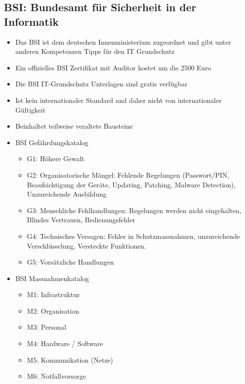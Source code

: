 \subsection{BSI: Bundesamt für Sicherheit in der Informatik}
\begin{itemize}
	\item Das BSI ist dem deutschen Innenministerium zugeordnet und gibt unter anderen Kompetenzen Tipps für den IT Grundschutz
	\item Ein offizielles BSI Zertifikat mit Auditor kostet um die 2500 Euro
	\item Die BSI IT-Grundschutz Unterlagen sind gratis verfügbar
	\item Ist kein internationaler Standard und daher nicht von internationaler Gültigkeit
	\item Beinhaltet teilweise veraltete Bausteine
	\item BSI Gefährdungskatalog
	\begin{itemize}
		\item G1: Höhere Gewalt
		\item G2: Organisatorische Mängel: Fehlende Regelungen (Passwort/PIN, Beaufsichtigung der Geräte, Updating, Patching, Malware Detection), Unzureichende Ausbildung
		\item G3: Menschliche Fehlhandlungen: Regelungen werden nicht eingehalten, Blindes Vertrauen, Bedienungsfehler
		\item G4: Technisches Versagen: Fehler in Schutzmassnahmen, unzureichende Verschlüsselung, Versteckte Funktionen.
		\item G5: Vorsätzliche Handlungen
	\end{itemize}
	\item BSI Massnahmenkatalog
	\begin{itemize}
		\item M1: Infrastruktur
		\item M2: Organisation
		\item M3: Personal
		\item M4: Hardware / Software
		\item M5: Kommunikation (Netze)
		\item M6: Notfallvorsorge
	\end{itemize}
\end{itemize}

